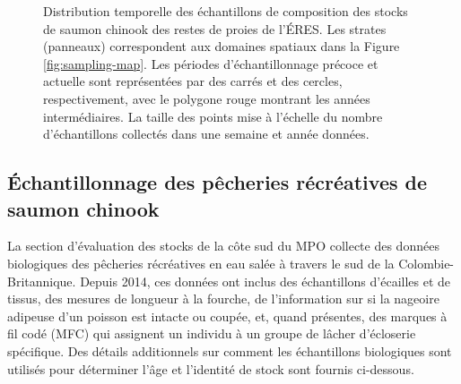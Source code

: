 \begin{figure}[H]
    \caption{Distribution temporelle des échantillons de composition des stocks de saumon chinook des restes de proies de l'ÉRES. Les strates (panneaux) correspondent aux domaines spatiaux dans la Figure \ref{fig:sampling-map}. Les périodes d'échantillonnage précoce et actuelle sont représentées par des carrés et des cercles, respectivement, avec le polygone rouge montrant les années intermédiaires. La taille des points mise à l'échelle du nombre d'échantillons collectés dans une semaine et année données.}
    \label{fig:temporal-diet-samples}
\end{figure}

\subsection{Échantillonnage des pêcheries récréatives de saumon chinook}

La section d'évaluation des stocks de la côte sud du MPO collecte des données biologiques des pêcheries récréatives en eau salée à travers le sud de la Colombie-Britannique. Depuis 2014, ces données ont inclus des échantillons d'écailles et de tissus, des mesures de longueur à la fourche, de l'information sur si la nageoire adipeuse d'un poisson est intacte ou coupée, et, quand présentes, des marques à fil codé (MFC) qui assignent un individu à un groupe de lâcher d'écloserie spécifique. Des détails additionnels sur comment les échantillons biologiques sont utilisés pour déterminer l'âge et l'identité de stock sont fournis ci-dessous.

